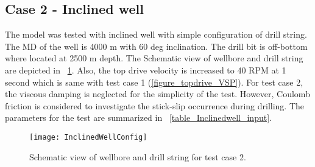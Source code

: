 
\newpage
\subsection{Case 2 - Inclined well}

The model was tested with inclined well with simple configuration of drill string. The MD of the well is 4000 m with 60 deg inclination. The drill bit is off-bottom where located at 2500 m depth. The Schematic view of wellbore and drill string are depicted in \figurename~\ref{figure_wellconfig_inclined}. Also, the top drive velocity is increased to 40 RPM at 1 second which is same with test case 1 (\figurename\ref{figure_topdrive_VSP}). For test case 2, the viscous damping is neglected for the simplicity of the test. However, Coulomb friction is considered to investigate the stick-slip occurrence during drilling. The parameters for the test are summarized in \tablename~\ref{table_Inclinedwell_input}.

\begin{figure}[!hbt]
  \centering
  \texttt{[image: InclinedWellConfig]}
  \caption[Schematic view of test case 2.]{Schematic view of wellbore and drill string for test case 2.}\label{figure_wellconfig_inclined}
\end{figure}


